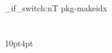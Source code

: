 \ctuthesis_if_switch:nT { pkg-makeidx } {

	\usepackage{makeidx}
	\makeindex

	\usepackage{multicol}
	
	 { } {
		\chapter* {\indexname }
		\let\item\@idxitem
		\titlespacing*\section{}{10pt}{4pt}
	} {
		\clearpage
	}
	
	\newcommand\ctu@savetocdepth{\xdef\ctu@saved@tocdepth{\the\c@tocdepth}}
	\newcommand\ctu@restoretocdepth{\global\c@tocdepth\ctu@saved@tocdepth\relax}
}






